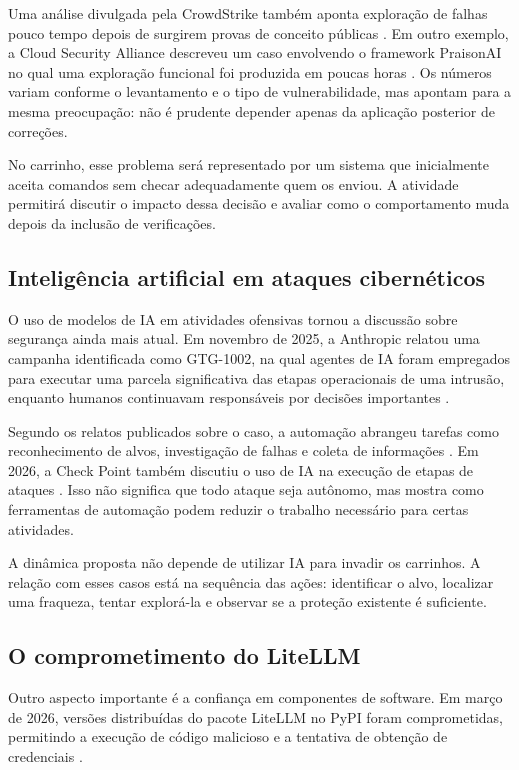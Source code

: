\documentclass[12pt,a4paper]{article}
\begin{document}
Uma análise divulgada pela CrowdStrike também aponta exploração de falhas
pouco tempo depois de surgirem provas de conceito públicas
\cite{crowdstrike2026}. Em outro exemplo, a Cloud Security Alliance descreveu
um caso envolvendo o framework PraisonAI no qual uma exploração funcional foi
produzida em poucas horas \cite{csa2026praison}. Os números variam conforme o
levantamento e o tipo de vulnerabilidade, mas apontam para a mesma preocupação:
não é prudente depender apenas da aplicação posterior de correções.

No carrinho, esse problema será representado por um sistema que inicialmente
aceita comandos sem checar adequadamente quem os enviou. A atividade permitirá
discutir o impacto dessa decisão e avaliar como o comportamento muda depois da
inclusão de verificações.

\subsection{Inteligência artificial em ataques cibernéticos}
O uso de modelos de IA em atividades ofensivas tornou a discussão sobre
segurança ainda mais atual. Em novembro de 2025, a Anthropic relatou uma
campanha identificada como GTG-1002, na qual agentes de IA foram empregados
para executar uma parcela significativa das etapas operacionais de uma
intrusão, enquanto humanos continuavam responsáveis por decisões importantes
\cite{thn2025gtg1002}.

Segundo os relatos publicados sobre o caso, a automação abrangeu tarefas como
reconhecimento de alvos, investigação de falhas e coleta de informações
\cite{bdtech2025,aimag2025}. Em 2026, a Check Point também discutiu o uso de IA
na execução de etapas de ataques \cite{checkpoint2026}. Isso não significa que
todo ataque seja autônomo, mas mostra como ferramentas de automação podem
reduzir o trabalho necessário para certas atividades.

A dinâmica proposta não depende de utilizar IA para invadir os carrinhos.
A relação com esses casos está na sequência das ações: identificar o alvo,
localizar uma fraqueza, tentar explorá-la e observar se a proteção existente
é suficiente.

\subsection{O comprometimento do LiteLLM}
Outro aspecto importante é a confiança em componentes de software. Em março
de 2026, versões distribuídas do pacote LiteLLM no PyPI foram comprometidas,
permitindo a execução de código malicioso e a tentativa de obtenção de
credenciais \cite{arthur2026litellm,infoq2026litellm}.
\end{document}
